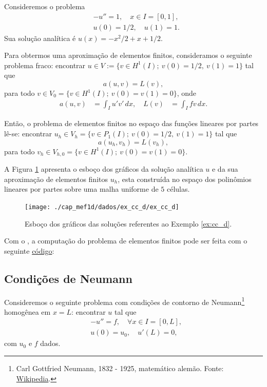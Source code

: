 \begin{ex}\label{ex:cc_d}
  Consideremos o problema
  \begin{align}
    &-u'' = 1,\quad x\in I=[0,1],\label{eq:ex_cc_d_eq}\\
    &u(0) = 1/2,\quad u(1) = 1.\label{eq:ex_cc_d_bc}
  \end{align}
Sua solução analítica é $u(x) = -x^2/2+x+1/2$. 

Para obtermos uma aproximação de elementos finitos, consideramos o seguinte problema fraco: encontrar $u\in V := \{v\in H^1(I);~v(0)=1/2,~v(1)=1\}$ tal que
\begin{equation}
  a(u,v) = L(v),
\end{equation}
para todo $v\in V_0 = \{v\in H^1(I);~v(0)=v(1)=0\}$, onde
\begin{align}
  a(u, v) &= \int_I u'v'\,dx,\quad L(v) &= \int_I fv\,dx.
\end{align}

Então, o problema de elementos finitos no espaço das funções lineares por partes lê-se: encontrar $u_h\in V_h = \{v\in P_1(I);~v(0)=1/2,~v(1)=1\}$ tal que
\begin{equation}
  a(u_h, v_h) = L(v_h),
\end{equation}
para todo $v_h\in V_{h,0} = \{v\in H^1(I);~v(0)=v(1)=0\}$.

A Figura \ref{fig:ex_cc_d} apresenta o esboço dos gráficos da solução analítica $u$ e da sua aproximação de elementos finitos $u_h$, esta construída no espaço dos polinômios lineares por partes sobre uma malha uniforme de $5$ células.

\begin{figure}[h!]
  \centering
  \texttt{[image: ./cap\_mef1d/dados/ex\_cc\_d/ex\_cc\_d]}
  \caption{Esboço dos gráficos das soluções referentes ao Exemplo \ref{ex:cc_d}.}
  \label{fig:ex_cc_d}
\end{figure}

\ifispython
Com o \fenics, a computação do problema de elementos finitos pode ser feita com o seguinte \href{https://github.com/phkonzen/notas/blob/master/src/MetodoElementosFinitos/cap_mef1d/dados/ex_cc_d/ex_cc_d.py}{código}:

\fi
\end{ex}

\subsection{Condições de Neumann}

Consideremos o seguinte problema com condições de contorno de Neumann\footnote{Carl Gottfried Neumann, 1832 - 1925, matemático alemão. Fonte: \href{https://en.wikipedia.org/wiki/Carl_Neumann}{Wikipedia}.} homogênea em $x=L$: encontrar $u$ tal que
\begin{align}
  &-u'' = f,\quad \forall x\in I=[0, L],\label{eq:cc_n_eq}\\
  &u(0) = u_0,\quad u'(L) = 0,\label{eq:cc_n_bc}
\end{align}
com $u_0$ e $f$ dados.

